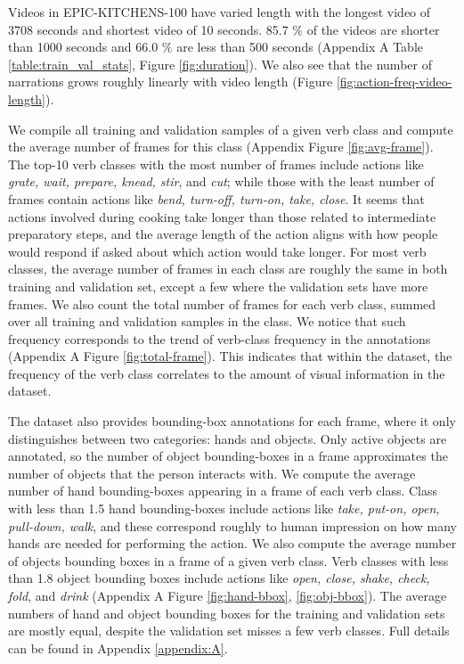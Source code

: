 Videos in EPIC-KITCHENS-100 have varied length with the longest video of 3708 seconds and shortest video of 10 seconds. 85.7 $\%$ of the videos are shorter than 1000 seconds and 66.0 $\%$ are less than 500 seconds (Appendix A Table \ref{table:train_val_stats}, Figure \ref{fig:duration}). 
We also see that the number of narrations grows roughly linearly with video length (Figure \ref{fig:action-freq-video-length}).  

We compile all training and validation samples of a given verb class and compute the average number of frames for this class (Appendix Figure \ref{fig:avg-frame}). The top-10 verb classes with the most number of frames include actions like \textit{grate, wait, prepare, knead, stir}, and \textit{cut}; while those with the least number of frames contain actions like \textit{bend, turn-off, turn-on, take, close}. It seems that actions involved during cooking take longer than those related to intermediate preparatory steps, and the average length of the action aligns with how people would respond if asked about which action would take longer. For most verb classes, the average number of frames in each class are roughly the same in both training and validation set, except a few where the validation sets have more frames. We also count the total number of frames for each verb class, summed over all training and validation samples in the class. We notice that such frequency corresponds to the trend of verb-class frequency in the annotations (Appendix A Figure \ref{fig:total-frame}). This indicates that within the dataset, the frequency of the verb class correlates to the amount of visual information in the dataset.

The dataset also provides bounding-box annotations for each frame, where it only distinguishes between two categories: hands and objects. Only active objects are annotated, so the number of object bounding-boxes in a frame approximates the number of objects that the person interacts with. We compute the average number of hand bounding-boxes appearing in a frame of each verb class. Class with less than 1.5 hand bounding-boxes include actions like \textit{take, put-on, open, pull-down, walk}, and these correspond roughly to human impression on how many hands are needed for performing the action. We also compute the average number of objects bounding boxes in a frame of a given verb class. Verb classes with less than 1.8 object bounding boxes include actions like \textit{open, close, shake, check, fold}, and \textit{drink} (Appendix A Figure \ref{fig:hand-bbox}, \ref{fig:obj-bbox}). 
The average numbers of hand and object bounding boxes for the training and validation sets are mostly equal, despite the validation set misses a few verb classes. Full details can be found in Appendix \ref{appendix:A}.